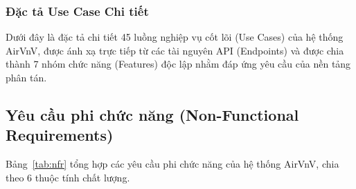 \subsubsection{Đặc tả Use Case Chi tiết}
Dưới đây là đặc tả chi tiết 45 luồng nghiệp vụ cốt lõi (Use Cases) của hệ thống AirVnV, được ánh xạ trực tiếp từ các tài nguyên API (Endpoints) và được chia thành 7 nhóm chức năng (Features) độc lập nhằm đáp ứng yêu cầu của nền tảng phân tán.





\subsection{Yêu cầu phi chức năng (Non-Functional Requirements)}
\label{subsec:yeu_cau_phi_chuc_nang}

Bảng~\ref{tab:nfr} tổng hợp các yêu cầu phi chức năng của hệ thống AirVnV,
chia theo 6 thuộc tính chất lượng.

